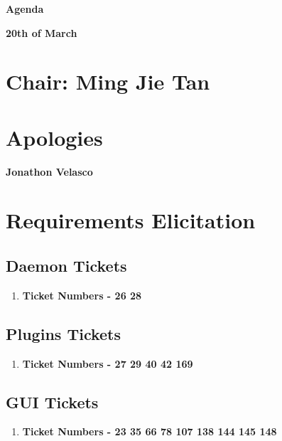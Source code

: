 \documentclass[10pt,english, a4paper]{article}
\begin{document}
\begin{center}
\textbf{\huge Agenda}{\par}
\textbf{20th of March}
\par\end{center}{\huge \par}


\section*{{Chair: Ming Jie Tan}}

\section{{Apologies}}

\textbf{Jonathon Velasco}{ \par}

\section{{Requirements Elicitation}}

\subsection{{Daemon Tickets}}

\begin{enumerate}
\item \textbf{Ticket Numbers - 26 28}{ \par}
\end{enumerate}

\subsection{{Plugins Tickets}}

\begin{enumerate}
\item \textbf{Ticket Numbers - 27 29 40 42 169}{ \par}
\end{enumerate}

\subsection{{GUI Tickets}}

\begin{enumerate}
\item \textbf{Ticket Numbers - 23 35 66 78 107 138 144 145 148}{ \par}
\end{enumerate}
\end{document}
